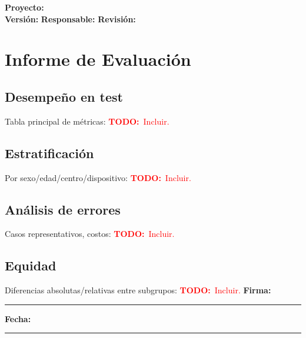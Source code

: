 \documentclass[11pt]{article}
\newcommand{\project}{\textbf{Proyecto:} \underline{\hspace{7cm}}}
\newcommand{\version}{\textbf{Versi\'on:} \underline{\hspace{3cm}}}
\newcommand{\owner}{\textbf{Responsable:} \underline{\hspace{5cm}}}
\newcommand{\review}{\textbf{Revisi\'on:} \underline{\hspace{3cm}}}
\newcommand{\signatureline}{\vspace{0.5cm}\noindent\textbf{Firma:}\ \rule{6cm}{0.4pt} \hfill \textbf{Fecha:}\ \rule{3cm}{0.4pt}}
\newcommand{\todo}[1]{\textcolor{red}{\textbf{TODO:}~#1}}
\begin{document}
\begin{flushright}
\project \\ \version \hspace{1cm} \owner \hspace{1cm} \review
\end{flushright}


\section*{Informe de Evaluaci\'on}
\subsection*{Desempe\~no en test}
Tabla principal de m\'etricas: \todo{Incluir.}

\subsection*{Estratificaci\'on}
Por sexo/edad/centro/dispositivo: \todo{Incluir.}

\subsection*{An\'alisis de errores}
Casos representativos, costos: \todo{Incluir.}

\subsection*{Equidad}
Diferencias absolutas/relativas entre subgrupos: \todo{Incluir.}
\signatureline

\label{LastPage}
\end{document}
